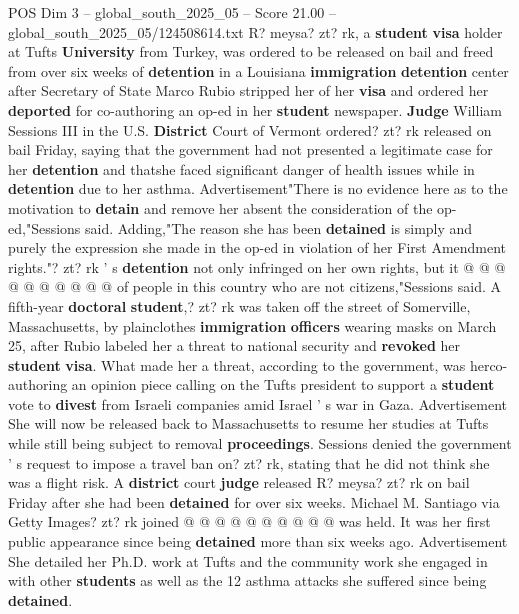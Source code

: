 \begin{textsample}{POS Dim 3 – global\_south\_2025\_05 – Score 21.00 – global\_south\_2025\_05/124508614.txt}  \label{ex:f3_pos_232}
R? meysa? zt? rk, a \textbf{student} \textbf{visa} holder at Tufts \textbf{University} from Turkey, was ordered to be released on bail and freed from over six weeks of \textbf{detention} in a Louisiana \textbf{immigration} \textbf{detention} center after Secretary of State Marco Rubio stripped her of her \textbf{visa} and ordered her \textbf{deported} for co-authoring an op-ed in her \textbf{student} newspaper. \textbf{Judge} William Sessions III in the U.S. \textbf{District} Court of Vermont ordered? zt? rk released on bail Friday, saying that the government had not presented a legitimate case for her \textbf{detention} and thatshe faced significant danger of health issues while in \textbf{detention} due to her asthma.
Advertisement"There is no evidence here as to the motivation to \textbf{detain} and remove her absent the consideration of the op-ed,"Sessions said.
Adding,"The reason she has been \textbf{detained} is simply and purely the expression she made in the op-ed in violation of her First Amendment rights."? zt? rk ' s \textbf{detention} not only infringed on her own rights, but it @ @ @ @ @ @ @ @ @ @ of people in this country who are not citizens,"Sessions said.
A fifth-year \textbf{doctoral} \textbf{student},? zt? rk was taken off the street of Somerville, Massachusetts, by plainclothes \textbf{immigration} \textbf{officers} wearing masks on March 25, after Rubio labeled her a threat to national security and \textbf{revoked} her \textbf{student} \textbf{visa}.
What made her a threat, according to the government, was herco-authoring an opinion piece calling on the Tufts president to support a \textbf{student} vote to \textbf{divest} from Israeli companies amid Israel ' s war in Gaza.
Advertisement She will now be released back to Massachusetts to resume her studies at Tufts while still being subject to removal \textbf{proceedings}.
Sessions denied the government ' s request to impose a travel ban on? zt? rk, stating that he did not think she was a flight risk.
A \textbf{district} court \textbf{judge} released R? meysa? zt? rk on bail Friday after she had been \textbf{detained} for over six weeks.
Michael M.
Santiago via Getty Images? zt? rk joined @ @ @ @ @ @ @ @ @ @ was held.
It was her first public appearance since being \textbf{detained} more than six weeks ago.
Advertisement She detailed her Ph.D. work at Tufts and the community work she engaged in with other \textbf{students} as well as the 12 asthma attacks she suffered since being \textbf{detained}.

\end{textsample}
